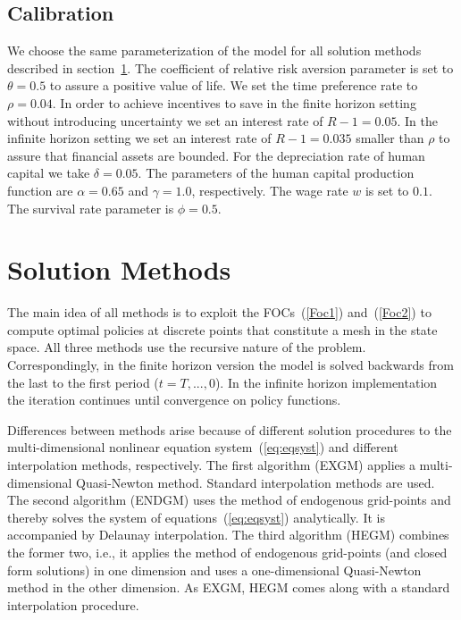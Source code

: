 \documentclass[a4paper,12pt]{article}
\begin{document}
\subsection{Calibration}

We choose the same parameterization of the model for all solution methods described in section~\ref{s:solmeth}. The coefficient of relative risk aversion parameter is set to $\theta=0.5$ to assure a positive value of life. We set the time preference rate to $\rho=0.04$. In order to achieve incentives to save in the finite horizon setting without introducing uncertainty we set an interest rate of $R-1=0.05$. In the infinite horizon setting we set an interest rate of $R-1=0.035$ smaller than $\rho$ to assure that financial assets are bounded. For the depreciation rate of human capital we take $\delta=0.05.$ The parameters of the human capital production function are $\alpha=0.65$ and $\gamma=1.0$, respectively. The wage rate $w$ is set to $0.1$. The survival rate parameter is $\phi=0.5$.

\section{Solution Methods}
\label{s:solmeth}

The main idea of all methods is to exploit the FOCs~(\ref{Foc1}) and~(\ref{Foc2}) to compute optimal policies at discrete points that constitute a mesh in the state space. All three methods use the recursive nature of the problem. Correspondingly, in the finite horizon version the model is solved backwards from the last to the first period ($t=T,...,0$). In the infinite horizon implementation the iteration continues until convergence on policy functions.

Differences between methods arise because of different solution procedures to the multi-dimensional nonlinear equation system~(\ref{eq:eqsyst}) and different interpolation methods, respectively. The first algorithm (EXGM) applies a multi-dimensional Quasi-Newton method. Standard interpolation methods are used. The second algorithm (ENDGM) uses the method of endogenous grid-points and thereby solves the system of equations~(\ref{eq:eqsyst}) analytically. It is accompanied by Delaunay interpolation. The third algorithm (HEGM) combines the former two, i.e., it applies the method of endogenous grid-points (and closed form solutions) in one dimension and uses a one-dimensional Quasi-Newton method in the other dimension. As EXGM, HEGM comes along with a standard interpolation procedure.
\end{document}
